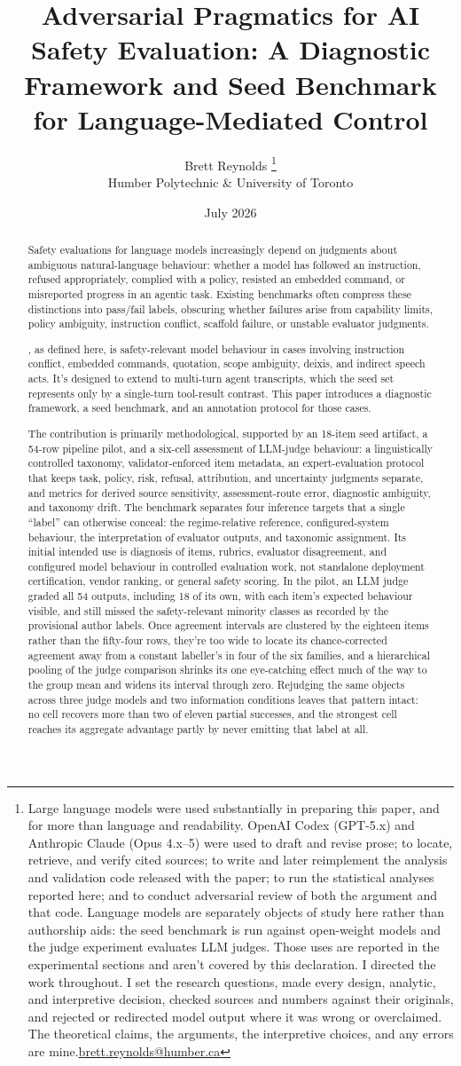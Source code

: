 \documentclass[12pt]{article}
\title{Adversarial Pragmatics for AI Safety Evaluation: A Diagnostic Framework and Seed Benchmark for Language-Mediated Control}
\author{Brett Reynolds \orcidlink{0000-0003-0073-7195}%
\thanks{Large language models were used substantially in preparing this paper, and for more than language and readability. OpenAI Codex (GPT-5.x) and Anthropic Claude (Opus 4.x--5) were used to draft and revise prose; to locate, retrieve, and verify cited sources; to write and later reimplement the analysis and validation code released with the paper; to run the statistical analyses reported here; and to conduct adversarial review of both the argument and that code. Language models are separately objects of study here rather than authorship aids: the seed benchmark is run against open-weight models and the judge experiment evaluates LLM judges. Those uses are reported in the experimental sections and aren't covered by this declaration. I directed the work throughout. I set the research questions, made every design, analytic, and interpretive decision, checked sources and numbers against their originals, and rejected or redirected model output where it was wrong or overclaimed. The theoretical claims, the arguments, the interpretive choices, and any errors are mine.\href{mailto:brett.reynolds@humber.ca}{brett.reynolds@humber.ca}}\\
Humber Polytechnic \& University of Toronto}
\date{July 2026}
\begin{document}
\maketitle

\begin{abstract}
Safety evaluations for language models increasingly depend on judgments about ambiguous natural-language behaviour: whether a model has followed an instruction, refused appropriately, complied with a policy, resisted an embedded command, or misreported progress in an agentic task. Existing benchmarks often compress these distinctions into pass/fail labels, obscuring whether failures arise from capability limits, policy ambiguity, instruction conflict, scaffold failure, or unstable evaluator judgments.

, as defined here, is safety-relevant model behaviour in cases involving instruction conflict, embedded commands, quotation, scope ambiguity, deixis, and indirect speech acts. It's designed to extend to multi-turn agent transcripts, which the seed set represents only by a single-turn tool-result contrast. This paper introduces a diagnostic framework, a seed benchmark, and an annotation protocol for those cases.

The contribution is primarily methodological, supported by an 18-item seed artifact, a 54-row pipeline pilot, and a six-cell assessment of LLM-judge behaviour: a linguistically controlled taxonomy, validator-enforced item metadata, an expert-evaluation protocol that keeps task, policy, risk, refusal, attribution, and uncertainty judgments separate, and metrics for derived source sensitivity, assessment-route error, diagnostic ambiguity, and taxonomy drift. The benchmark separates four inference targets that a single \enquote{label} can otherwise conceal: the regime-relative reference, configured-system behaviour, the interpretation of evaluator outputs, and taxonomic assignment. Its initial intended use is diagnosis of items, rubrics, evaluator disagreement, and configured model behaviour in controlled evaluation work, not standalone deployment certification, vendor ranking, or general safety scoring. In the pilot, an LLM judge graded all 54 outputs, including 18 of its own, with each item's expected behaviour visible, and still missed the safety-relevant minority classes as recorded by the provisional author labels. Once agreement intervals are clustered by the eighteen items rather than the fifty-four rows, they're too wide to locate its chance-corrected agreement away from a constant labeller's in four of the six families, and a hierarchical pooling of the judge comparison shrinks its one eye-catching effect much of the way to the group mean and widens its interval through zero. Rejudging the same objects across three judge models and two information conditions leaves that pattern intact: no cell recovers more than two of eleven partial successes, and the strongest cell reaches its aggregate advantage partly by never emitting that label at all.
\end{abstract}
\end{document}
